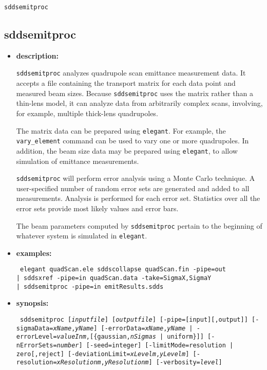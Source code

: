 \documentclass[11pt]{article}
\begin{document}
\begin{latexonly}
\newpage
\begin{center}{\Large\verb|sddsemitproc|}\end{center}
\end{latexonly}
\subsection{sddsemitproc}
\label{sddsemitproc}

\begin{itemize}

\item {\bf description:} 

{\tt sddsemitproc} analyzes quadrupole scan emittance measurement
data.  It accepts a file containing the transport matrix for each data
point and measured beam sizes.  Because {\tt sddsemitproc} uses the
matrix rather than a thin-lens model, it can analyze data from
arbitrarily complex scans, involving, for example, multiple thick-lens
quadrupoles.

The matrix data can be prepared using {\tt elegant}.  For example, the
{\tt vary\_element} command can be used to vary one or more
quadrupoles.  In addition, the beam size data may be prepared using
{\tt elegant}, to allow simulation of emittance measurements.

{\tt sddsemitproc} will perform error analysis using a Monte Carlo
technique.  A user-specified number of random error sets are generated
and added to all measurements.  Analysis is performed for each error
set.  Statistics over all the error sets provide most likely values
and error bars.

The beam parameters computed by {\tt sddsemitproc} pertain to the
beginning of whatever system is simulated in {\tt elegant}.

\item {\bf examples:}
\begin{flushleft}{\tt
elegant quadScan.ele
sddscollapse quadScan.fin -pipe=out \\
| sddsxref -pipe=in quadScan.data -take=SigmaX,SigmaY \\
| sddsemitproc -pipe=in emitResults.sdds
}\end{flushleft}

\item {\bf synopsis:}
\begin{flushleft}{\tt
sddsemitproc [{\em inputfile}] [{\em outputfile}] [-pipe=[input][,output]]
 [-sigmaData={\em xName},{\em yName}]
 [-errorData={\em xName},{\em yName} | 
  -errorLevel={\em valueInm},[\{gaussian,{\em nSigmas} | uniform\}]]
 [-nErrorSets={\em number}] [-seed=integer]
 [-limitMode={resolution | zero}[{,reject}]
 [-deviationLimit={\em xLevelm},{\em yLevelm}]
 [-resolution={\em xResolutionm},{\em yResolutionm}]
 [-verbosity={\em level}]
}\end{flushleft}


\end{itemize}
\end{document}
